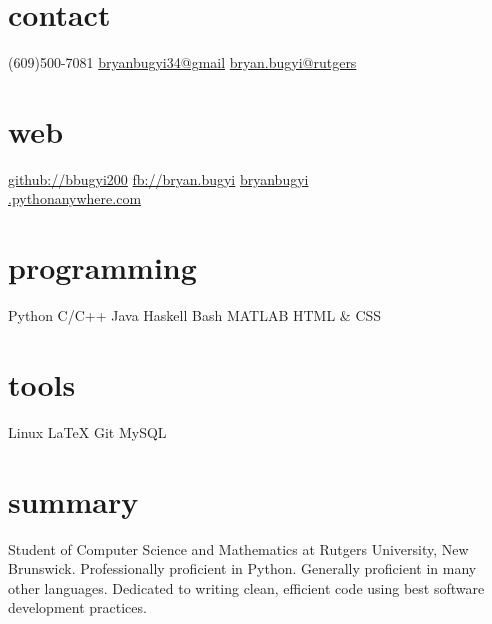 \documentclass[]{friggeri-cv}
\newlength\myheight
\newlength\mydepth
\newcommand*\inlinegraphics[2]{%
  \settototalheight\myheight{Xygp}%
  \settodepth\mydepth{Xygp}%
  \raisebox{-\mydepth}{\texttt{[image: \#1]}}%
}
\begin{document}

\begin{aside}
  \section{contact}
    (609)500-7081
    \href{mailto:bryanbugyi34@gmail.com}{bryanbugyi34@gmail}
    \href{mailto:bryan.bugyi@rutgers.edu}{bryan.bugyi@rutgers}
  \section{web}
    \href{https://github.com/bbugyi200}{github://bbugyi200}
    \href{http://facebook.com/bryan.bugyi}{fb://bryan.bugyi}\vspace{0.3cm}
    \href{http://bryanbugyi.pythonanywhere.com}{bryanbugyi\\.pythonanywhere.com}
  \section{programming}
    \inlinegraphics{heart.jpg}{5} Python
    C/C++
    Java
    Haskell
    Bash
    MATLAB
    HTML \& CSS
 \section{tools}
	Linux
	\LaTeX
	Git
	MySQL
\end{aside}

\section{summary}
    { \small
        Student of Computer Science and Mathematics at Rutgers University, New Brunswick. Professionally proficient in Python. Generally proficient in many other languages. Dedicated to writing clean, efficient code using best software development practices.
    }
\end{document}
